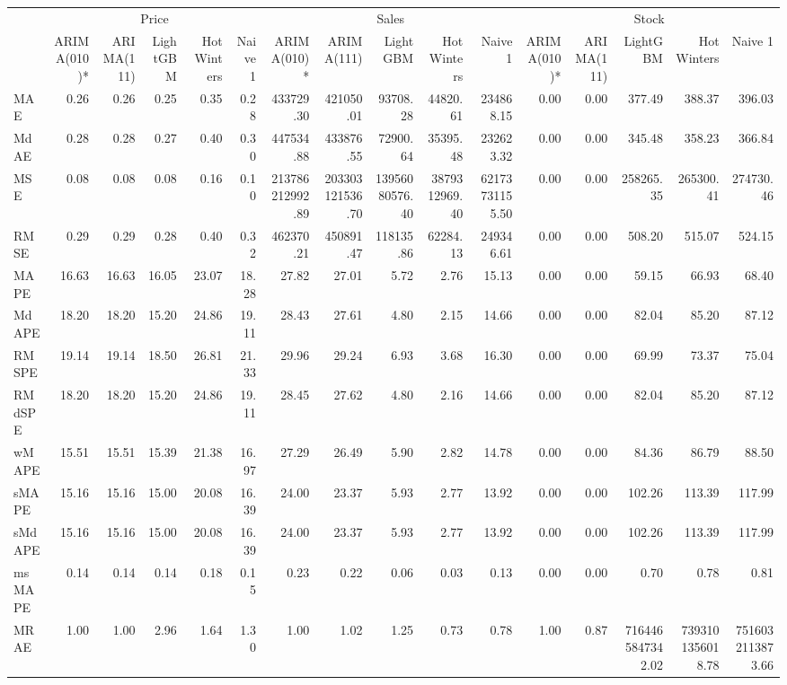 \begin{tabular}{l|rrrrr|rrrrr|rrrrr}
\toprule
 & \multicolumn{5}{c}{Price} & \multicolumn{5}{c}{Sales} & \multicolumn{5}{c}{Stock} \\
 & ARIMA(010)* & ARIMA(111) & LightGBM & Hot Winters & Naive 1 & ARIMA(010)* & ARIMA(111) & LightGBM & Hot Winters & Naive 1 & ARIMA(010)* & ARIMA(111) & LightGBM & Hot Winters & Naive 1 \\
\midrule
MAE & 0.26 & 0.26 & 0.25 & 0.35 & 0.28 & 433729.30 & 421050.01 & 93708.28 & 44820.61 & 234868.15 & 0.00 & 0.00 & 377.49 & 388.37 & 396.03 \\
MdAE & 0.28 & 0.28 & 0.27 & 0.40 & 0.30 & 447534.88 & 433876.55 & 72900.64 & 35395.48 & 232623.32 & 0.00 & 0.00 & 345.48 & 358.23 & 366.84 \\
MSE & 0.08 & 0.08 & 0.08 & 0.16 & 0.10 & 213786212992.89 & 203303121536.70 & 13956080576.40 & 3879312969.40 & 62173731155.50 & 0.00 & 0.00 & 258265.35 & 265300.41 & 274730.46 \\
RMSE & 0.29 & 0.29 & 0.28 & 0.40 & 0.32 & 462370.21 & 450891.47 & 118135.86 & 62284.13 & 249346.61 & 0.00 & 0.00 & 508.20 & 515.07 & 524.15 \\
MAPE & 16.63 & 16.63 & 16.05 & 23.07 & 18.28 & 27.82 & 27.01 & 5.72 & 2.76 & 15.13 & 0.00 & 0.00 & 59.15 & 66.93 & 68.40 \\
MdAPE & 18.20 & 18.20 & 15.20 & 24.86 & 19.11 & 28.43 & 27.61 & 4.80 & 2.15 & 14.66 & 0.00 & 0.00 & 82.04 & 85.20 & 87.12 \\
RMSPE & 19.14 & 19.14 & 18.50 & 26.81 & 21.33 & 29.96 & 29.24 & 6.93 & 3.68 & 16.30 & 0.00 & 0.00 & 69.99 & 73.37 & 75.04 \\
RMdSPE & 18.20 & 18.20 & 15.20 & 24.86 & 19.11 & 28.45 & 27.62 & 4.80 & 2.16 & 14.66 & 0.00 & 0.00 & 82.04 & 85.20 & 87.12 \\
wMAPE & 15.51 & 15.51 & 15.39 & 21.38 & 16.97 & 27.29 & 26.49 & 5.90 & 2.82 & 14.78 & 0.00 & 0.00 & 84.36 & 86.79 & 88.50 \\
sMAPE & 15.16 & 15.16 & 15.00 & 20.08 & 16.39 & 24.00 & 23.37 & 5.93 & 2.77 & 13.92 & 0.00 & 0.00 & 102.26 & 113.39 & 117.99 \\
sMdAPE & 15.16 & 15.16 & 15.00 & 20.08 & 16.39 & 24.00 & 23.37 & 5.93 & 2.77 & 13.92 & 0.00 & 0.00 & 102.26 & 113.39 & 117.99 \\
msMAPE & 0.14 & 0.14 & 0.14 & 0.18 & 0.15 & 0.23 & 0.22 & 0.06 & 0.03 & 0.13 & 0.00 & 0.00 & 0.70 & 0.78 & 0.81 \\
MRAE & 1.00 & 1.00 & 2.96 & 1.64 & 1.30 & 1.00 & 1.02 & 1.25 & 0.73 & 0.78 & 1.00 & 0.87 & 7164465847342.02 & 7393101356018.78 & 7516032113873.66 \\

\end{tabular}
